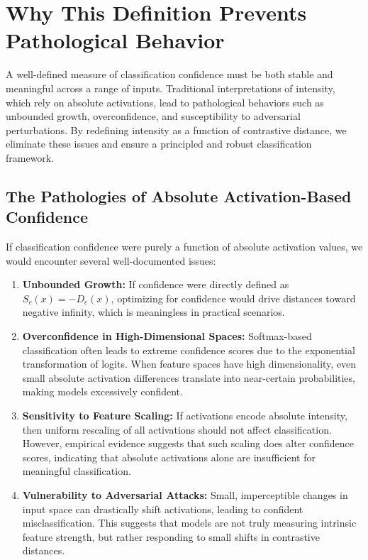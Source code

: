 \section{Why This Definition Prevents Pathological Behavior}

A well-defined measure of classification confidence must be both stable and meaningful across a range of inputs. Traditional interpretations of intensity, which rely on absolute activations, lead to pathological behaviors such as unbounded growth, overconfidence, and susceptibility to adversarial perturbations. By redefining intensity as a function of contrastive distance, we eliminate these issues and ensure a principled and robust classification framework.

\subsection{The Pathologies of Absolute Activation-Based Confidence}

If classification confidence were purely a function of absolute activation values, we would encounter several well-documented issues:

\begin{enumerate}
    \item \textbf{Unbounded Growth:} If confidence were directly defined as \( S_c(x) = -D_c(x) \), optimizing for confidence would drive distances toward negative infinity, which is meaningless in practical scenarios.
    \item \textbf{Overconfidence in High-Dimensional Spaces:} Softmax-based classification often leads to extreme confidence scores due to the exponential transformation of logits. When feature spaces have high dimensionality, even small absolute activation differences translate into near-certain probabilities, making models excessively confident.
    \item \textbf{Sensitivity to Feature Scaling:} If activations encode absolute intensity, then uniform rescaling of all activations should not affect classification. However, empirical evidence suggests that such scaling does alter confidence scores, indicating that absolute activations alone are insufficient for meaningful classification.
    \item \textbf{Vulnerability to Adversarial Attacks:} Small, imperceptible changes in input space can drastically shift activations, leading to confident misclassification. This suggests that models are not truly measuring intrinsic feature strength, but rather responding to small shifts in contrastive distances.
\end{enumerate}

